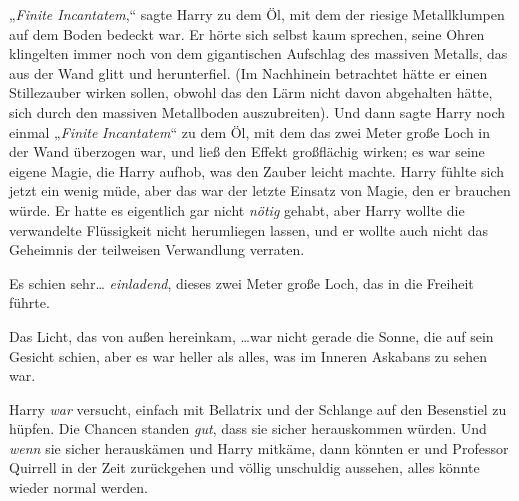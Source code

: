 „\emph{Finite Incantatem},“ sagte Harry zu dem Öl, mit dem der riesige Metallklumpen auf dem Boden bedeckt war. Er hörte sich selbst kaum sprechen, seine Ohren klingelten immer noch von dem gigantischen Aufschlag des massiven Metalls, das aus der Wand glitt und herunterfiel. (Im Nachhinein betrachtet hätte er einen Stillezauber wirken sollen, obwohl das den Lärm nicht davon abgehalten hätte, sich durch den massiven Metallboden auszubreiten). Und dann sagte Harry noch einmal „\emph{Finite} \emph{Incantatem}“ zu dem Öl, mit dem das zwei Meter große Loch in der Wand überzogen war, und ließ den Effekt großflächig wirken; es war seine eigene Magie, die Harry aufhob, was den Zauber leicht machte. Harry fühlte sich jetzt ein wenig müde, aber das war der letzte Einsatz von Magie, den er brauchen würde. Er hatte es eigentlich gar nicht \emph{nötig} gehabt, aber Harry wollte die verwandelte Flüssigkeit nicht herumliegen lassen, und er wollte auch nicht das Geheimnis der teilweisen Verwandlung verraten.

Es schien sehr… \emph{einladend}, dieses zwei Meter große Loch, das in die Freiheit führte.

Das Licht, das von außen hereinkam, …war nicht gerade die Sonne, die auf sein Gesicht schien, aber es war heller als alles, was im Inneren Askabans zu sehen war.

Harry \emph{war} versucht, einfach mit Bellatrix und der Schlange auf den Besenstiel zu hüpfen. Die Chancen standen \emph{gut}, dass sie sicher herauskommen würden. Und \emph{wenn} sie sicher herauskämen und Harry mitkäme, dann könnten er und Professor Quirrell in der Zeit zurückgehen und völlig unschuldig aussehen, alles könnte wieder normal werden.

